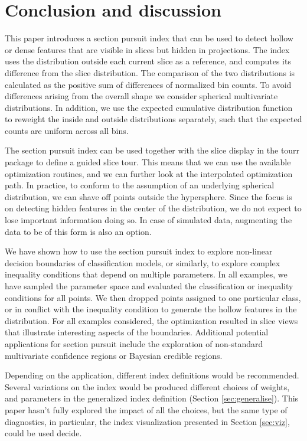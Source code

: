 \documentclass[]{interact}
\theoremstyle{plain}%
\theoremstyle{definition}
\theoremstyle{remark}
\begin{document}
\hypertarget{conclusion-and-discussion}{%
\section{Conclusion and discussion}\label{conclusion-and-discussion}}

This paper introduces a section pursuit index that can be used to detect
hollow or dense features that are visible in slices but hidden in
projections. The index uses the distribution outside each current slice
as a reference, and computes its difference from the slice distribution.
The comparison of the two distributions is calculated as the positive
sum of differences of normalized bin counts. To avoid differences
arising from the overall shape we consider spherical multivariate
distributions. In addition, we use the expected cumulative distribution
function to reweight the inside and outside distributions separately,
such that the expected counts are uniform across all bins.

The section pursuit index can be used together with the slice display in
the tourr package to define a guided slice tour. This means that we can
use the available optimization routines, and we can further look at the
interpolated optimization path. In practice, to conform to the
assumption of an underlying spherical distribution, we can shave off
points outside the hypersphere. Since the focus is on detecting hidden
features in the center of the distribution, we do not expect to lose
important information doing so. In case of simulated data, augmenting
the data to be of this form is also an option.

We have shown how to use the section pursuit index to explore non-linear
decision boundaries of classification models, or similarly, to explore
complex inequality conditions that depend on multiple parameters. In all
examples, we have sampled the parameter space and evaluated the
classification or inequality conditions for all points. We then dropped
points assigned to one particular class, or in conflict with the
inequality condition to generate the hollow features in the
distribution. For all examples considered, the optimization resulted in
slice views that illustrate interesting aspects of the boundaries.
Additional potential applications for section pursuit include the
exploration of non-standard multivariate confidence regions or Bayesian
credible regions.

Depending on the application, different index definitions would be
recommended. Several variations on the index would be produced different
choices of weights, and parameters in the generalized index definition
(Section \ref{sec:generalise}). This paper hasn't fully explored the
impact of all the choices, but the same type of diagnostics, in
particular, the index visualization presented in Section \ref{sec:viz},
could be used decide.
\end{document}
